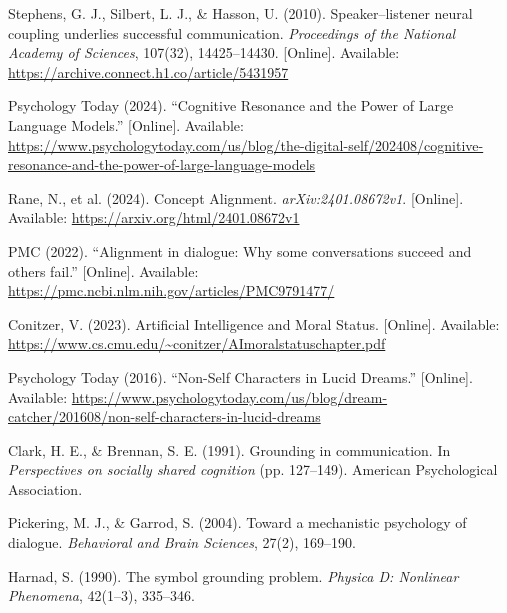 \documentclass{article}
\begin{document}
\begin{thebibliography}{9}

Stephens, G. J., Silbert, L. J., \& Hasson, U. (2010).
Speaker--listener neural coupling underlies successful communication.
\textit{Proceedings of the National Academy of Sciences}, 107(32), 14425--14430.
[Online]. Available: \url{https://archive.connect.h1.co/article/5431957}

Psychology Today (2024).
``Cognitive Resonance and the Power of Large Language Models.''
[Online]. Available: \url{https://www.psychologytoday.com/us/blog/the-digital-self/202408/cognitive-resonance-and-the-power-of-large-language-models}

Rane, N., et al. (2024).
Concept Alignment.
\textit{arXiv:2401.08672v1}.
[Online]. Available: \url{https://arxiv.org/html/2401.08672v1}

PMC (2022).
``Alignment in dialogue: Why some conversations succeed and others fail.''
[Online]. Available: \url{https://pmc.ncbi.nlm.nih.gov/articles/PMC9791477/}

Conitzer, V. (2023).
Artificial Intelligence and Moral Status.
[Online]. Available: \url{https://www.cs.cmu.edu/~conitzer/AImoralstatuschapter.pdf}

Psychology Today (2016).
``Non-Self Characters in Lucid Dreams.''
[Online]. Available: \url{https://www.psychologytoday.com/us/blog/dream-catcher/201608/non-self-characters-in-lucid-dreams}

Clark, H. E., \& Brennan, S. E. (1991).
Grounding in communication.
In \textit{Perspectives on socially shared cognition} (pp. 127--149).
American Psychological Association.

Pickering, M. J., \& Garrod, S. (2004).
Toward a mechanistic psychology of dialogue.
\textit{Behavioral and Brain Sciences}, 27(2), 169--190.

Harnad, S. (1990).
The symbol grounding problem.
\textit{Physica D: Nonlinear Phenomena}, 42(1--3), 335--346.

\end{thebibliography}
\end{document}

